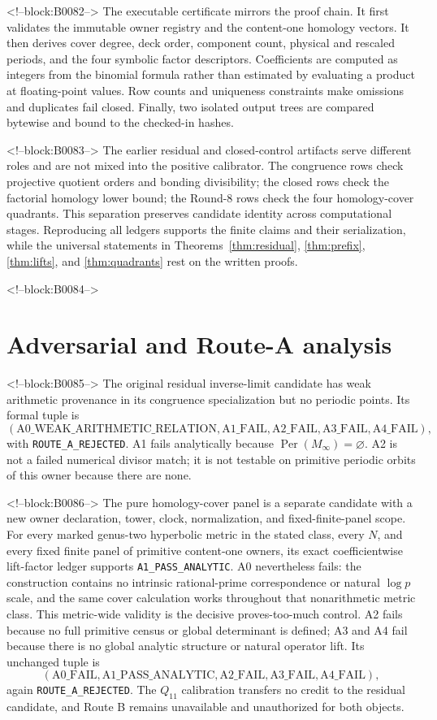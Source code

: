 \documentclass[11pt]{article}
\theoremstyle{definition}
\theoremstyle{remark}
\newcommand{\Per}{\operatorname{Per}}
\begin{document}
<!--block:B0082-->
The executable certificate mirrors the proof chain. It first validates the immutable owner registry and the content-one homology vectors. It then derives cover degree, deck order, component count, physical and rescaled periods, and the four symbolic factor descriptors. Coefficients are computed as integers from the binomial formula rather than estimated by evaluating a product at floating-point values. Row counts and uniqueness constraints make omissions and duplicates fail closed. Finally, two isolated output trees are compared bytewise and bound to the checked-in hashes.

<!--block:B0083-->
The earlier residual and closed-control artifacts serve different roles and are not mixed into the positive calibrator. The congruence rows check projective quotient orders and bonding divisibility; the closed rows check the factorial homology lower bound; the Round-8 rows check the four homology-cover quadrants. This separation preserves candidate identity across computational stages. Reproducing all ledgers supports the finite claims and their serialization, while the universal statements in Theorems~\ref{thm:residual}, \ref{thm:prefix}, \ref{thm:lifts}, and \ref{thm:quadrants} rest on the written proofs.

<!--block:B0084-->
\section{Adversarial and Route-A analysis}

<!--block:B0085-->
The original residual inverse-limit candidate has weak arithmetic provenance in its congruence specialization but no periodic points. Its formal tuple is
\[
(\mathrm{A0\_WEAK\_ARITHMETIC\_RELATION},
\mathrm{A1\_FAIL},\mathrm{A2\_FAIL},\mathrm{A3\_FAIL},\mathrm{A4\_FAIL}),
\]
with \texttt{ROUTE\_A\_REJECTED}. A1 fails analytically because $\Per(M_\infty)=\varnothing$. A2 is not a failed numerical divisor match; it is not testable on primitive periodic orbits of this owner because there are none.

<!--block:B0086-->
The pure homology-cover panel is a separate candidate with a new owner declaration, tower, clock, normalization, and fixed-finite-panel scope. For every marked genus-two hyperbolic metric in the stated class, every $N$, and every fixed finite panel of primitive content-one owners, its exact coefficientwise lift-factor ledger supports \texttt{A1\_PASS\_ANALYTIC}. A0 nevertheless fails: the construction contains no intrinsic rational-prime correspondence or natural $\log p$ scale, and the same cover calculation works throughout that nonarithmetic metric class. This metric-wide validity is the decisive proves-too-much control. A2 fails because no full primitive census or global determinant is defined; A3 and A4 fail because there is no global analytic structure or natural operator lift. Its unchanged tuple is
\[
(\mathrm{A0\_FAIL},\mathrm{A1\_PASS\_ANALYTIC},
\mathrm{A2\_FAIL},\mathrm{A3\_FAIL},\mathrm{A4\_FAIL}),
\]
again \texttt{ROUTE\_A\_REJECTED}. The $Q_{11}$ calibration transfers no credit to the residual candidate, and Route B remains unavailable and unauthorized for both objects.
\end{document}
